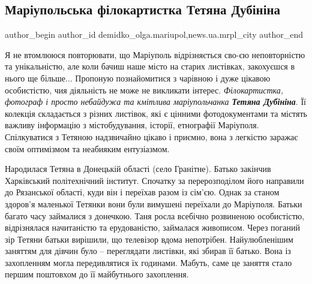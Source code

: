  
 
 
 
 
 
\subsection{Маріупольська філокартистка Тетяна Дубініна}
\label{sec:17_04_2020.stz.news.ua.mrpl_city.1.mrpl_filokartistka_tetjana_dubinina}
 
\ifcmt
 author_begin
   author_id demidko_olga.mariupol,news.ua.mrpl_city
 author_end
\fi


Я не втомлююся повторювати, що Маріуполь відрізняється сво\hyp{}єю неповторністю та
унікальністю, але коли бачиш наше місто на старих листівках, закохуєшся в нього
ще більше... Пропоную познайомитися з чарівною і дуже цікавою особистістю, чия
діяльність не може не викликати інтерес. \emph{Філокартистка, фотограф і просто
небайдужа та кмітлива маріупольчанка \textbf{Тетяна Дубініна}}. Її колекція складається з
різних листівок, які є цінними фотодокументами та містять важливу інформацію з
містобудування, історії, етнографії Маріуполя. Спілкуватися з Тетяною
надзвичайно цікаво і приємно, вона з легкістю заражає своїм оптимізмом та
неабияким ентузіазмом.

Народилася Тетяна в Донецькій області (село Гранітне). Батько закінчив
Харківський політехнічний інститут. Спочатку за перерозподілом його направили
до Рязанської області, куди він і переїхав разом із сім'єю. Однак за станом
здоров'я маленької Тетянки вони були вимушені переїхали до Маріуполя. Батьки
багато часу займалися з донечкою. Таня росла всебічно розвиненою особистістю,
відрізнялася начитаністю та ерудованістю, займалася живописом. Через поганий
зір Тетяни батьки вирішили, що телевізор вдома непотрібен. Найулюбленішим
заняттям для дівчин було – переглядати листівки, які збирав її батько. Вона із
захопленням могла передивлятися їх годинами. Мабуть, саме це заняття стало
першим поштовхом до її майбутнього захоплення.

